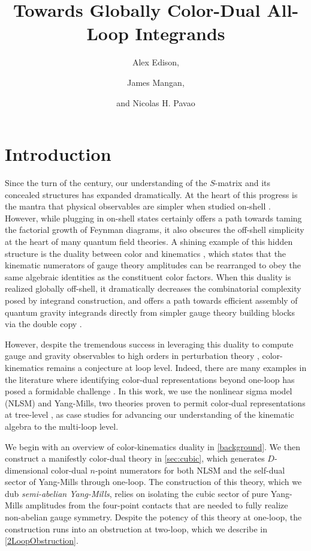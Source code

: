 \documentclass[11pt,letter]{article}
\author{\large Alex Edison,}
\author{\large James Mangan,}
\author{\large and Nicolas H. Pavao}
\affiliation{Department of Physics and Astronomy, Northwestern
  University, Evanston, Illinois 60208, USA}
\title{\center  \fontsize{18.8}{20} \selectfont  Towards Globally Color-Dual All-Loop Integrands}
\begin{document}
\maketitle
\flushbottom
 

\section{Introduction}\label{intro}
Since the turn of the century, our understanding of the $S$-matrix and
its concealed structures has expanded dramatically. At the heart of this
progress is the mantra that physical observables are simpler when
studied on-shell
\cite{Parke:1986gb,TasiLance,Cheung:2017pzi}. However, while plugging
in on-shell states certainly offers a path towards taming the
factorial growth of Feynman diagrams, it also obscures the off-shell
simplicity at the heart of many quantum field theories. A shining
example of this hidden structure is the duality between color and
kinematics \cite{BCJ,Bern:2010ue,BCJreview}, which states that the
kinematic numerators of gauge theory amplitudes can be rearranged to
obey the same algebraic identities as the constituent color
factors. When this duality is realized globally off-shell, it
dramatically decreases the combinatorial complexity posed by integrand
construction, and offers a path towards efficient assembly of quantum
gravity integrands directly from simpler gauge theory building blocks
via the double copy \cite{BCJ,Bern:2010ue}.

However, despite the tremendous success in leveraging this duality to
compute gauge and gravity observables to high orders in perturbation
theory \cite{FiveLoopN4, GeneralizedDoubleCopyFiveLoops, Bern:2018jmv,
  Carrasco:2021otn}, color-kinematics remains a conjecture at loop
level. Indeed, there are many examples in the literature where
identifying color-dual representations beyond one-loop has posed a
formidable challenge
\cite{Mogull:2015adi, Johansson:2017bfl, KalinN2TwoLoop, Bern:2015ooa}. In this work, we use
the nonlinear sigma model (NLSM) and Yang-Mills, two theories proven
to permit color-dual representations at tree-level
\cite{Feng:2010my,Cachazo:2014xea}, as case studies for advancing our
understanding of the kinematic algebra to the multi-loop level.

We begin with an overview of color-kinematics duality in
\cref{background}. We then construct a manifestly color-dual theory in
\cref{sec:cubic}, which generates $D$-dimensional color-dual $n$-point
numerators for both NLSM and the self-dual sector of Yang-Mills
through one-loop. The construction of this theory, which we dub
\textit{semi-abelian Yang-Mills}, relies on isolating the cubic sector
of pure Yang-Mills amplitudes from the four-point contacts that are
needed to fully realize non-abelian gauge symmetry. Despite the
potency of this theory at one-loop, the construction runs into an
obstruction at two-loop, which we describe in \cref{2LoopObstruction}.
\end{document}

